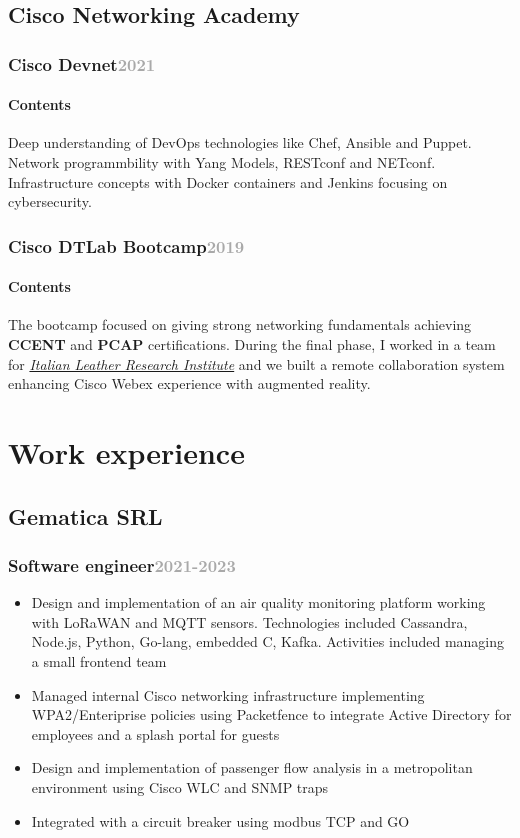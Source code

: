 \documentclass[11pt,a4paper]{article}
\begin{document}
  \subsection{Cisco Networking Academy}
  \subsubsection{Cisco Devnet\hfill \textcolor{darkgray}{\small{2021}}} 
  \paragraph{Contents}Deep understanding of DevOps technologies like Chef, Ansible and Puppet. Network programmbility with Yang Models, RESTconf and NETconf. Infrastructure concepts with Docker containers and Jenkins focusing on cybersecurity.
  \subsubsection{Cisco DTLab Bootcamp\hfill \textcolor{darkgray}{\small{2019}}} 
  \paragraph{Contents} The bootcamp focused on giving strong networking fundamentals achieving \textbf{CCENT} and \textbf{PCAP} certifications. During the final phase, I worked in a team for \href{https://ssip.it/}{\textit{Italian Leather Research Institute}} and we built a remote collaboration system enhancing Cisco Webex experience with augmented reality.

  \section*{Work experience}
  \subsection{Gematica SRL}
  \subsubsection{Software engineer\hfill \textcolor{darkgray}{\small{2021-2023}}}
  \begin{itemize}
    \item Design and implementation of an air quality monitoring platform working with LoRaWAN and MQTT sensors. Technologies included Cassandra, Node.js, Python, Go-lang, embedded C, Kafka. Activities included managing a small frontend team
    \item Managed internal Cisco networking infrastructure implementing WPA2/Enteriprise policies using Packetfence to integrate Active Directory for employees and a splash portal for guests
    \item Design and implementation of passenger flow analysis in a metropolitan environment using Cisco WLC and SNMP traps
    \item Integrated with a circuit breaker using modbus TCP and GO
  \end{itemize}
\end{document}
